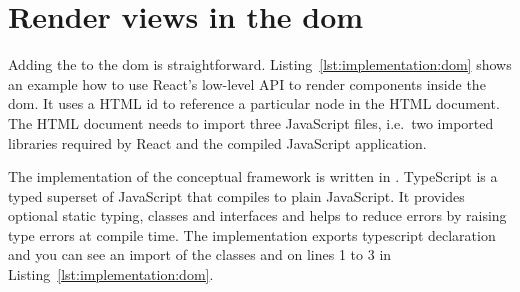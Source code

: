 \section{Render views in the \gls{dom}}

Adding the \gv{} to the \gls{dom} is straightforward.
Listing~\ref{lst:implementation:dom} shows an example how to use React's low-level API to render components inside the \gls{dom}.
It uses a HTML id  to reference a particular node in the HTML document.
The HTML document needs to import three JavaScript files, i.e.\ two imported libraries required by React and the compiled JavaScript application.



The implementation of the conceptual framework is written in .
TypeScript is a typed superset of JavaScript that compiles to plain JavaScript.
It provides optional static typing, classes and interfaces and helps to reduce errors by raising type errors at compile time.
The implementation exports typescript declaration and you can see an import of the classes  and  on lines 1 to 3 in Listing~\ref{lst:implementation:dom}.






